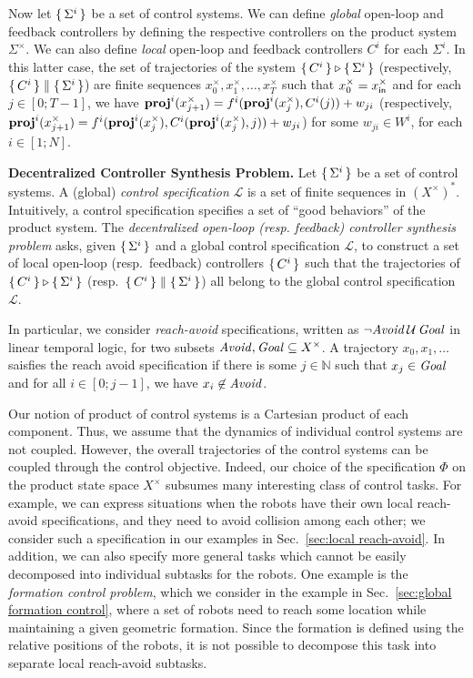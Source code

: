 Now let $\set{\Sigma^i}$ be a set of control systems.
We can define \emph{global} open-loop and feedback controllers by defining the respective controllers on the product system $\Sigma^\times$.
We can also define \emph{local} open-loop and feedback controllers $C^i$ for each $\Sigma^i$.
In this latter case, the set of trajectories of the system $\set{C^i} \triangleright \set{\Sigma^i}$ (respectively, $\set{C^i}\parallel \set{\Sigma^i}$)
are finite sequences 
$x_0^\times, x_1^\times, \ldots, x_T^\times$ such that
$x_0^\times = x_{\mathsf{in}}^\times$ and for each $j \in [0;T-1]$, we have 
$\mathbf{proj}^{i}(x_{j+1}^\times) = f^i(\mathbf{proj}^i(x_j^\times), C^i(j))+w_{ji}$
(respectively, 
$\mathbf{proj}^{i}(x_{j+1}^\times) = f^i(\mathbf{proj}^i(x_j^\times), C^i(\mathbf{proj}^i(x_j^\times), j))+w_{ji}$)
for some $w_{ji} \in W^i$, for each $i\in [1;N]$.

\smallskip
\noindent
\textbf{Decentralized Controller Synthesis Problem.}
Let $\set{\Sigma^i}$ be a set of control systems.
A (global) \emph{control specification} $\mathcal{L}$ is a set of finite sequences in $(X^\times)^*$.
Intuitively, a control specification specifies a set of ``good behaviors'' of the product system.
The \emph{decentralized open-loop (resp. feedback) controller synthesis problem} asks, given $\set{\Sigma^i}$ and a global control specification $\mathcal{L}$,
to construct a set of local open-loop (resp.\ feedback) controllers $\set{C^i}$ such that
the trajectories of $\set{C^i}\triangleright \set{\Sigma^i}$ (resp.\ $\set{C^i}\parallel \set{\Sigma^i}$) all belong to the global
control specification $\mathcal{L}$.

In particular, we consider \emph{reach-avoid} specifications, written as  $\lnot\mathit{Avoid}\, \mathcal{U}\,\mathit{Goal}$ in linear temporal logic, for two subsets 
$\mathit{Avoid}, \mathit{Goal} \subseteq X^\times$.
A trajectory $x_0, x_1, \ldots$ saisfies the reach avoid specification if there is some $j\in \mathbb{N}$ such that $x_j \in\mathit{Goal}$ and
for all $i \in [0; j-1]$, we have $x_i \not \in\mathit{Avoid}$.

Our notion of product of control systems is a Cartesian product of each component. Thus, we assume that the dynamics of individual control
systems are not coupled.
However, the overall trajectories of the control systems can be coupled through the control objective.
Indeed, our choice of the specification $\Phi$ on the product state space $X^\times$ subsumes many interesting class of control tasks.
For example, we can express situations when the robots have their own local reach-avoid specifications, and they 
need to avoid collision among each other; we consider such a specification in our examples in Sec.~\ref{sec:local reach-avoid}.
In addition, we can also specify more general tasks which cannot be easily decomposed into individual subtasks for the robots.
One example is the \emph{formation control problem}, which we consider in the example in Sec.~\ref{sec:global formation control}, where a set of robots need to 
reach some location while maintaining a given geometric formation. 
Since the formation is defined using the relative positions of the robots, it is not possible to decompose this task into separate local reach-avoid subtasks.

